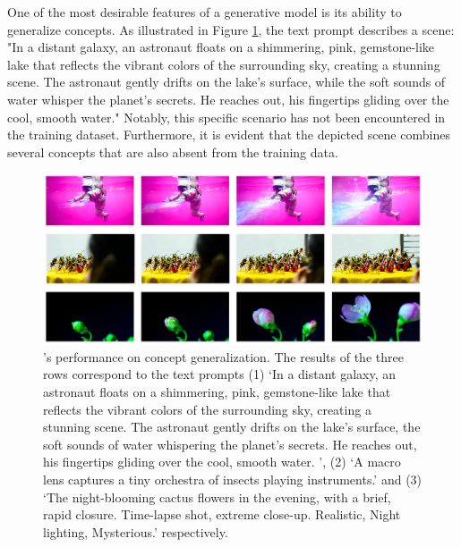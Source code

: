 One of the most desirable features of a generative model is its ability to generalize concepts. As illustrated in Figure \ref{fig:concept}, the text prompt describes a scene: "In a distant galaxy, an astronaut floats on a shimmering, pink, gemstone-like lake that reflects the vibrant colors of the surrounding sky, creating a stunning scene. The astronaut gently drifts on the lake's surface, while the soft sounds of water whisper the planet's secrets. He reaches out, his fingertips gliding over the cool, smooth water." Notably, this specific scenario has not been encountered in the training dataset. Furthermore, it is evident that the depicted scene combines several concepts that are also absent from the training data.
\begin{figure}[!htbp]
    \centering
    \includegraphics[width=\linewidth]{figures/concept.png}
    \caption{\small {\nameofmethod{}'s performance on concept generalization. The results of the three rows correspond to the text prompts (1) `In a distant galaxy, an astronaut floats on a shimmering, pink, gemstone-like lake that reflects the vibrant colors of the surrounding sky, creating a stunning scene. The astronaut gently drifts on the lake's surface, the soft sounds of water whispering the planet's secrets. He reaches out, his fingertips gliding over the cool, smooth water. ', (2) `A macro lens captures a tiny orchestra of insects playing instruments.' and (3) `The night-blooming cactus flowers in the evening, with a brief, rapid closure. Time-lapse shot, extreme close-up. Realistic, Night lighting, Mysterious.' respectively.} }
    \label{fig:concept}
\end{figure}

